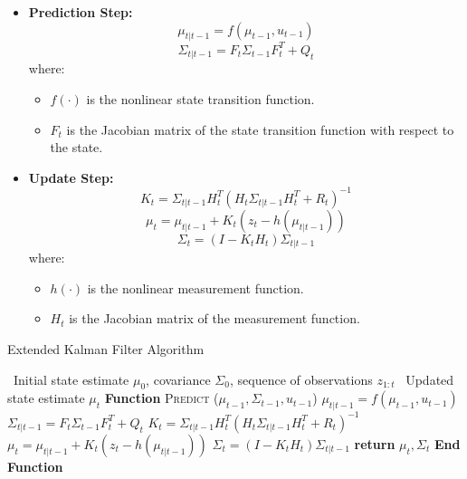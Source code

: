 \begin{itemize}
    \item \textbf{Prediction Step:}
    \begin{equation}
        \mu_{t|t-1} = f(\mu_{t-1}, u_{t-1})
    \end{equation}
    \begin{equation}
        \Sigma_{t|t-1} = F_t \Sigma_{t-1} F_t^T + Q_t
    \end{equation}
    where:
    \begin{itemize}
        \item $f(\cdot)$ is the nonlinear state transition function.
        \item $F_t$ is the Jacobian matrix of the state transition function with respect to the state.
    \end{itemize}

    \item \textbf{Update Step:}
    \begin{equation}
        K_t = \Sigma_{t|t-1} H_t^T {(H_t \Sigma_{t|t-1} H_t^T + R_t)}^{-1}
    \end{equation}
    \begin{equation}
        \mu_t = \mu_{t|t-1} + K_t (z_t - h(\mu_{t|t-1}))
    \end{equation}
    \begin{equation}
        \Sigma_t = (I - K_t H_t) \Sigma_{t|t-1}
    \end{equation}
    where:
    \begin{itemize}
        \item $h(\cdot)$ is the nonlinear measurement function.
        \item $H_t$ is the Jacobian matrix of the measurement function.
    \end{itemize}
\end{itemize}


\begin{algorithm}
    \caption{Extended Kalman Filter Algorithm}\label{alg:ekf}
    \begin{algorithmic}[1]
    \REQUIRE~Initial state estimate $\mu_0$, covariance $\Sigma_0$, sequence of observations $z_{1:t}$
    \ENSURE~Updated state estimate $\mu_{t}$
    \STATE\textbf{Function} \textsc{Predict} ($\mu_{t-1}, \Sigma_{t-1}, u_{t-1}$)
    \STATE\quad $\mu_{t|t-1} = f(\mu_{t-1}, u_{t-1})$
    \STATE\quad $\Sigma_{t|t-1} = F_t \Sigma_{t-1} F_t^T + Q_t$
    \STATE\quad $K_t = \Sigma_{t|t-1} H_t^T {(H_t \Sigma_{t|t-1} H_t^T + R_t)}^{-1}$
    \STATE\quad $\mu_{t} = \mu_{t|t-1} + K_t (z_t - h(\mu_{t|t-1}))$
    \STATE\quad $\Sigma_{t} = (I - K_t H_t) \Sigma_{t|t-1}$
    \STATE\quad \textbf{return} $\mu_{t}, \Sigma_{t}$
    \STATE\textbf{End Function}
    \end{algorithmic}
\end{algorithm}

